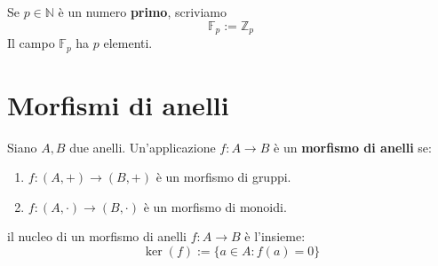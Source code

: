 \documentclass[../main.tex]{subfiles}
\begin{document}
\begin{remark}
    Se $p \in \mathbb{N}$ è un numero \textbf{primo}, scriviamo
    \[
        \boxed{
            \mathbb{F}_p := \mathbb{Z}_p
        }
    \]
    Il campo $\mathbb{F}_p$ ha $p$ elementi.
\end{remark}

\section{Morfismi di anelli}
\begin{definition}
    Siano $A,B$ due anelli. Un'applicazione $f : A \rightarrow B$ è un \textbf{morfismo di anelli} se:
    \begin{enumerate}[label=(\roman*)]
        \item $f: (A,+) \rightarrow (B,+)$ è un morfismo di gruppi.
        \item $f: (A,\cdot) \rightarrow (B,\cdot)$ è un morfismo di monoidi.
    \end{enumerate}
\end{definition}

\begin{definition}
    il nucleo di un morfismo di anelli $f : A \rightarrow B$ è l'insieme:
    \begin{equation*}
        \ker(f):=\{a \in A : f(a) = 0\}
    \end{equation*}
\end{definition}
\end{document}
